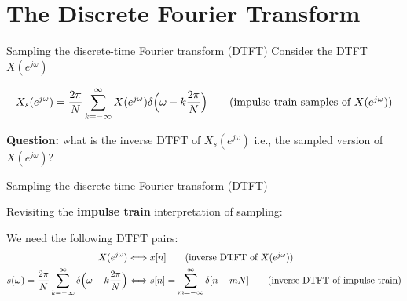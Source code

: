 \documentclass[10pt]{beamer}
\begin{document}
\section{The Discrete Fourier Transform}
\begin{frame}{Sampling the discrete-time Fourier transform (DTFT)}
	Consider the DTFT $X(e^{j\omega})$
	\begin{center}
		\resizebox{0.65\textwidth}{!}{}
	\end{center}
	\vspace{-0.25cm}	
	
	\pause	
	\begin{equation*}
		X_s(e^{j\omega}) = \frac{2\pi}{N}\sum_{k=-\infty}^\infty X(e^{j\omega})\delta\Big(\omega-k\frac{2\pi}{N}\Big) \tag{impulse train samples of $X(e^{j\omega})$}
	\end{equation*}
	
	\textbf{Question:} what is the inverse DTFT of $X_s(e^{j\omega})$ i.e., the sampled version of $X(e^{j\omega})$?

\end{frame}

%
\begin{frame}{Sampling the discrete-time Fourier transform (DTFT)}

Revisiting the \textbf{impulse train} interpretation of sampling:
\begin{center}
	\resizebox{\textwidth}{!}{}
\end{center}

We need the following DTFT pairs:
\begin{align*}
X(e^{j\omega}) &\Longleftrightarrow x[n] \tag{inverse DTFT of $X(e^{j\omega})$}\\
s(\omega) = \frac{2\pi}{N}\sum_{k=-\infty}^\infty\delta\Big(\omega-k\frac{2\pi}{N}\Big) &\Longleftrightarrow s[n] = \sum_{m=-\infty}^\infty\delta[n-mN] \tag{inverse DTFT of impulse train}
\end{align*}
\end{frame}
\end{document}
